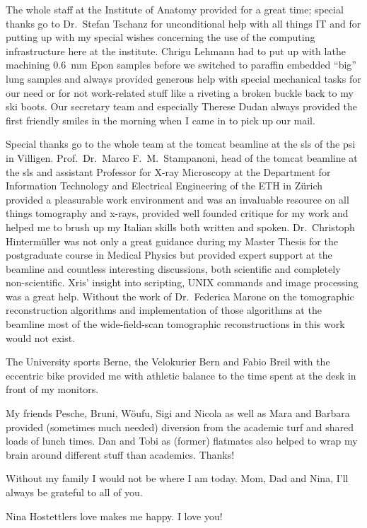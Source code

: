 The whole staff at the Institute of Anatomy provided for a great time; special thanks go to Dr.\ Stefan Tschanz for unconditional help with all things IT and for putting up with my special wishes concerning the use of the computing infrastructure here at the institute. Chrigu Lehmann had to put up with lathe machining \SI{0.6}{\milli\meter} Epon samples before we switched to paraffin embedded ``big'' lung samples and always provided generous help with special mechanical tasks for our need or for not work-related stuff like a riveting a broken buckle back to my ski boots. Our secretary team and especially Therese Dudan always provided the first friendly smiles in the morning when I came in to pick up our mail.

Special thanks go to the whole team at the \acs{tomcat} beamline at the \acl{sls} of the \acl{psi} in Villigen. Prof.\ Dr.\ Marco F.\ M.\ Stampanoni, head of the \acs{tomcat} beamline at the \acl{sls} and assistant Professor for X-ray Microscopy at the Department for Information Technology and Electrical Engineering of the ETH in Zürich provided a pleasurable work environment and was an invaluable resource on all things tomography and x-rays, provided well founded critique for my work and helped me to brush up my Italian skills both written and spoken. Dr.\ Christoph Hintermüller was not only a great guidance during my Master Thesis for the postgraduate course in Medical Physics but provided expert support at the beamline and countless interesting discussions, both scientific and completely non-scientific. Xris' insight into scripting, UNIX commands and image processing was a great help. Without the work of Dr.\ Federica Marone on the tomographic reconstruction algorithms and implementation of those algorithms at the beamline most of the wide-field-scan tomographic reconstructions in this work would not exist.

The University sports Berne, the Velokurier Bern and Fabio Breil with the eccentric bike provided me with athletic balance to the time spent at the desk in front of my monitors.

My friends Pesche, Bruni, Wöufu, Sigi and Nicola as well as Mara and Barbara provided (sometimes much needed) diversion from the academic turf and shared loads of lunch times. Dan and Tobi as (former) flatmates also helped to wrap my brain around different stuff than academics. Thanks!

Without my family I would not be where I am today. Mom, Dad and Nina, I'll always
be grateful to all of you.

Nina Hostettlers love makes me happy. I love you!
\endgroup